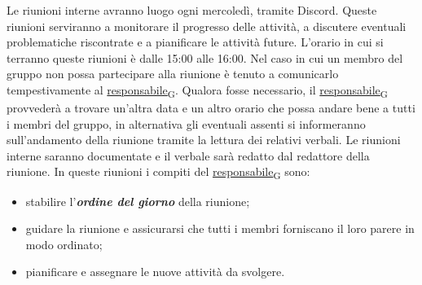 Le riunioni interne avranno luogo ogni mercoledì, tramite Discord. Queste riunioni serviranno a monitorare il progresso delle attività, a discutere eventuali problematiche riscontrate e a pianificare le attività future. L'orario in cui si terranno queste riunioni è dalle 15:00 alle 16:00. Nel caso in cui un membro del gruppo non possa partecipare alla riunione è tenuto a comunicarlo tempestivamente al \href{https://7last.github.io/docs/rtb/documentazione-interna/glossario\#responsabile}{responsabile\textsubscript{G}}. Qualora fosse necessario, il \href{https://7last.github.io/docs/rtb/documentazione-interna/glossario\#responsabile}{responsabile\textsubscript{G}} provvederà a trovare un'altra data e un altro orario che possa andare bene a tutti i membri del gruppo, in alternativa gli eventuali assenti si informeranno sull'andamento della riunione tramite la lettura dei relativi verbali. 
 Le riunioni interne saranno documentate e il verbale sarà redatto dal redattore della riunione. In queste riunioni i compiti del \href{https://7last.github.io/docs/rtb/documentazione-interna/glossario\#responsabile}{responsabile\textsubscript{G}} sono:
\begin{itemize}
    \item stabilire l'\textbf{\textit{ordine del giorno}} della riunione;
    \item guidare la riunione e assicurarsi che tutti i membri forniscano il loro parere in modo ordinato;
    \item pianificare e assegnare le nuove attività da svolgere.
\end{itemize}

